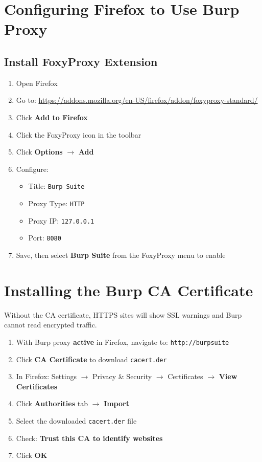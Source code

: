 \section{Configuring Firefox to Use Burp Proxy}

\subsection{Install FoxyProxy Extension}

\begin{enumerate}
  \item Open Firefox
  \item Go to: \url{https://addons.mozilla.org/en-US/firefox/addon/foxyproxy-standard/}
  \item Click \textbf{Add to Firefox}
  \item Click the FoxyProxy icon in the toolbar
  \item Click \textbf{Options} $\to$ \textbf{Add}
  \item Configure:
    \begin{itemize}
      \item Title: \texttt{Burp Suite}
      \item Proxy Type: \texttt{HTTP}
      \item Proxy IP: \texttt{127.0.0.1}
      \item Port: \texttt{8080}
    \end{itemize}
  \item Save, then select \textbf{Burp Suite} from the FoxyProxy menu to enable
\end{enumerate}


\section{Installing the Burp CA Certificate}

Without the CA certificate, HTTPS sites will show SSL warnings and Burp cannot read encrypted traffic.

\begin{enumerate}
  \item With Burp proxy \textbf{active} in Firefox, navigate to: \texttt{http://burpsuite}
  \item Click \textbf{CA Certificate} to download \texttt{cacert.der}
  \item In Firefox: Settings $\to$ Privacy \& Security $\to$ Certificates $\to$ \textbf{View Certificates}
  \item Click \textbf{Authorities} tab $\to$ \textbf{Import}
  \item Select the downloaded \texttt{cacert.der} file
  \item Check: \textbf{Trust this CA to identify websites}
  \item Click \textbf{OK}
\end{enumerate}


